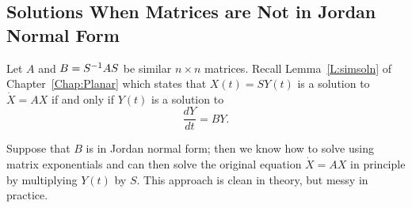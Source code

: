 \documentclass{ximera}
\begin{document}
\subsection*{Solutions When Matrices are Not in Jordan Normal Form} 

Let $A$ and $B=S^{-1} AS$ be similar $n\times n$ matrices.  Recall 
Lemma~\ref{L:simsoln} of Chapter~\ref{Chap:Planar} which states that 
$X(t)=SY(t)$ is a solution to $\dot{X}=AX$ if and only if $Y(t)$ is a 
solution to
\begin{equation} \label{E:JNFDE}
\frac{dY}{dt} = BY.
\end{equation}

Suppose that $B$ is in Jordan normal form; then we know how to solve 
 using matrix exponentials and can then solve the original
equation $\dot{X}=AX$ in principle by multiplying $Y(t)$ by $S$.  This 
approach is clean in theory, but messy in practice.  
\end{document}
